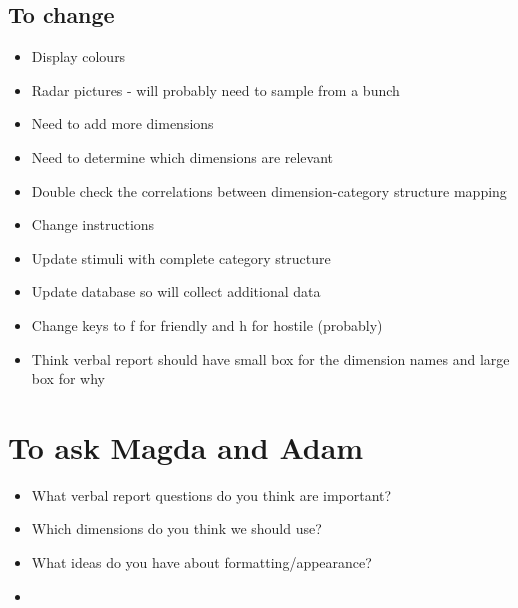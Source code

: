 \documentclass[doc, a4paper, apacite]{apa6}
\begin{document}
\subsection{To change}
\begin{itemize}
	\item Display colours \\
	\item Radar pictures - will probably need to sample from a bunch \\
	\item Need to add more dimensions \\
	\item Need to determine which dimensions are relevant \\
	\item Double check the correlations between dimension-category structure mapping \\
	\item Change instructions \\
	\item Update stimuli with complete category structure \\
	\item Update database so will collect additional data \\
	\item Change keys to f for friendly and h for hostile (probably) \\
	\item Think verbal report should have small box for the dimension names and large box for why \\
\end{itemize}

\section{To ask Magda and Adam}
\begin{itemize}
	\item What verbal report questions do you think are important? \\
	\item Which dimensions do you think we should use? \\
	\item What ideas do you have about formatting/appearance? \\
	\item 
\end{itemize}


\clearpage
\newpage


\end{document}
